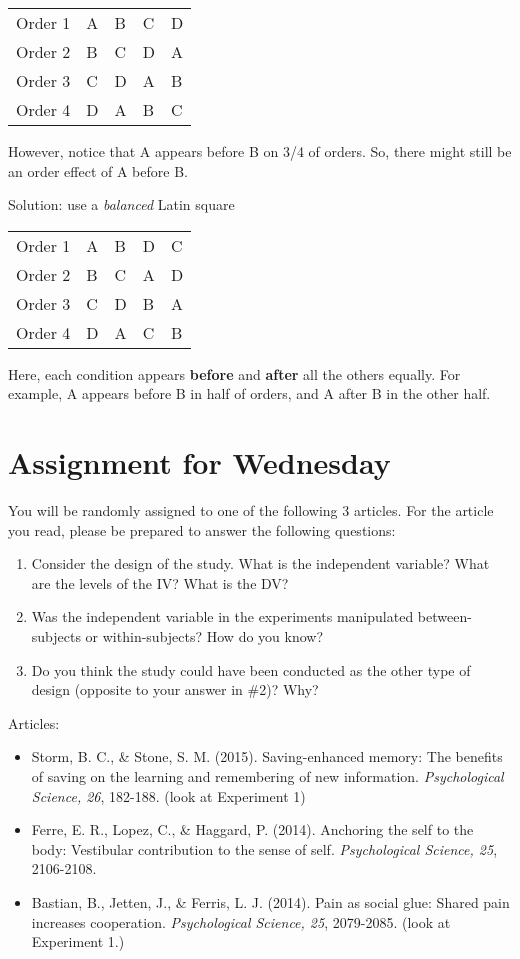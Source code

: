 \documentclass[11pt]{article}
\begin{document}
\begin{center}
\begin{tabular}{lllll}
Order 1 & A & B & C & D\\
Order 2 & B & C & D & A\\
Order 3 & C & D & A & B\\
Order 4 & D & A & B & C\\
\end{tabular}
\end{center}

However, notice that A appears before B on 3/4 of orders.  So, there might still be an order effect of A before B.

Solution: use a \emph{balanced} Latin square

\begin{center}
\begin{tabular}{lllll}
Order 1 & A & B & D & C\\
Order 2 & B & C & A & D\\
Order 3 & C & D & B & A\\
Order 4 & D & A & C & B\\
\end{tabular}
\end{center}

Here, each condition appears \textbf{before} and \textbf{after} all the others equally.  For example, A appears before B in half of orders, and A after B in the other half.

\section*{Assignment for Wednesday}
\label{sec-3}
You will be randomly assigned to one of the following 3 articles.  For the article you read, please be prepared to answer the following questions:

\begin{enumerate}
\item Consider the design of the study. What is the independent variable? What are the levels of the IV?  What is the DV?
\item Was the independent variable in the experiments manipulated between-subjects or within-subjects?  How do you know?
\item Do you think the study could have been conducted as the other type of design (opposite to your answer in \#2)?  Why?
\end{enumerate}

Articles: 
\begin{itemize}
\item Storm, B. C., \& Stone, S. M. (2015). Saving-enhanced memory: The benefits of saving on the learning and remembering of new information. \emph{Psychological Science, 26}, 182-188. (look at Experiment 1)
\item Ferre, E. R., Lopez, C., \& Haggard, P. (2014). Anchoring the self to the body: Vestibular contribution to the sense of self. \emph{Psychological Science, 25}, 2106-2108.
\item Bastian, B., Jetten, J., \& Ferris, L. J. (2014). Pain as social glue: Shared pain increases cooperation. \emph{Psychological Science, 25}, 2079-2085. (look at Experiment 1.)
\end{itemize}
\end{document}
